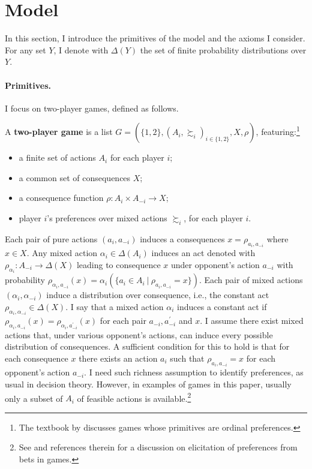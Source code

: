 \section{Model}\label{sec:modeluniv}

In this section, I introduce the primitives of the model and the axioms I consider. For any set \( Y \), I denote with \( \Delta ( Y ) \) the set of finite probability distributions over \( Y \).

\paragraph{Primitives.} I focus on two-player games, defined as follows.

\begin{definition}\label{def:game}
	A \textbf{two-player game} is a list \( G = ( \{1,2 \}, ( A_i, \succsim_i )_{i \in \{1,2 \}}, X,  \rho ) \), featuring:\footnote{The textbook by \cite{bonannoGameTheory2018} discusses games whose primitives are ordinal preferences.}
	\begin{itemize}
		\item a finite set of actions \(A_i\) for each player \( i \);
		\item a common set of consequences \( X \);
		\item a consequence function \(\rho \colon A_i \times  A_{-i} \rightarrow X \);
		\item player \(i\)'s preferences over mixed actions \(\succsim_i \), for each player \( i \).
	\end{itemize}
\end{definition}

Each pair of pure actions \( (a_i, a_{-i} ) \) induces a consequences \( x = \rho_{a_i, a_{-i}} \) where \( x \in X \). Any mixed action \( \alpha_i \in \Delta ( A_i ) \) induces an \citeauthor{anscombeDefinitionSubjectiveProbability1963} act denoted with \( \rho_{\alpha_i} \colon A_{-i} \rightarrow \Delta ( X ) \) leading to consequence \( x \) under opponent's action \( a_{-i} \) with probability \( \rho_{\alpha_i,a_{-i}} ( x ) = \alpha_i ( \{ a_i \in A_i \: | \: \rho_{a_i,a_{-i}} = x \} ) \). Each pair of mixed actions \( (\alpha_i, \alpha_{-i}) \) induce a distribution over consequence, i.e., the constant act \( \rho_{\alpha_i, \alpha_{-i}} \in \Delta (X) \). I say that a mixed action \( \alpha_i \) induces a constant act if \( \rho_{\alpha_i, a_{-i}} (x) = \rho_{\alpha_i, a^{\prime}_{-i}} (x) \) for each pair \(a_{-i}, a^{\prime}_{-i} \) and \( x \). I assume there exist mixed actions that, under various opponent's actions, can induce every possible distribution of consequences. A sufficient condition for this to hold is that for each consequence \( x \) there exists an action \( a_i \) such that \( \rho_{a_i,a_{-i}} = x \) for each opponent's action \( a_{-i} \). I need such richness assumption to identify preferences, as usual in decision theory. However, in examples of games in this paper, usually only a subset of \( A_i \) of feasible actions is available.\footnote{See \citet[p. 631]{dekelEpistemicGameTheory2015} and references therein for a discussion on elicitation of preferences from bets in games.}

